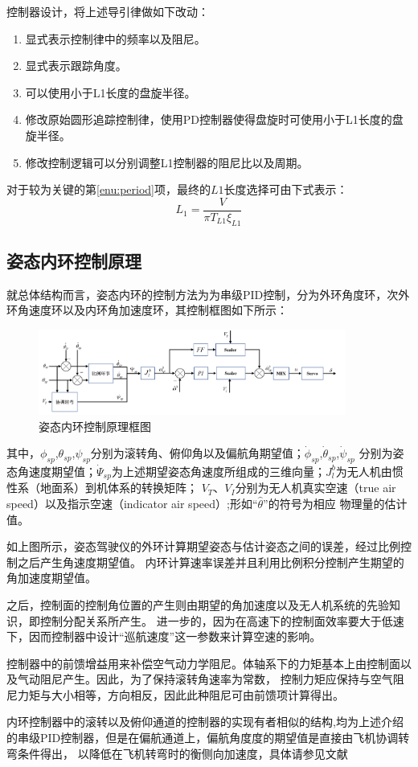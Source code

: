 控制器设计，将上述导引律做如下改动：
\begin{enumerate}
    \item 显式表示控制律中的频率以及阻尼。
    \item 显式表示跟踪角度。
    \item 可以使用小于L1长度的盘旋半径。
    \item 修改原始圆形追踪控制律，使用PD控制器使得盘旋时可使用小于L1长度的盘旋半径。
    \item 修改控制逻辑可以分别调整L1控制器的阻尼比以及周期。\label{enu:period}
\end{enumerate}
对于较为关键的第\ref{enu:period}项，最终的$L1$长度选择可由下式表示：
 \begin{equation}
     L_1 = \frac{V}{\pi T_{L1} \xi_{L1}}
\end{equation}
\subsection{姿态内环控制原理}
就总体结构而言，姿态内环的控制方法为为串级PID控制，分为外环角度环，次外环角速度环以及内环角加速度环，其控制框图如下所示：
\begin{figure}[H]
    \centering
    \includegraphics[width=0.90\textwidth]{figures/c3/attitude_inner_loop}
    \caption{姿态内环控制原理框图}\label{c3-attitude_inner_loop}
\end{figure}
其中，$\phi_{sp}$,$\theta_{sp}$,$\psi_{sp}$分别为滚转角、俯仰角以及偏航角期望值；$\dot{\phi}_{sp}$,$\dot{\theta}_{sp}$,$\dot{\psi}_{sp}$
分别为姿态角速度期望值；$\dot{\Psi}_{sp}$为上述期望姿态角速度所组成的三维向量；$J^{b}_l$为无人机由惯性系（地面系）到机体系的转换矩阵；
$V_T$、$V_I$分别为无人机真实空速（true air speed）以及指示空速（indicator air speed）;形如“$\hat{\theta}$”的符号为相应
物理量的估计值。

如上图所示，姿态驾驶仪的外环计算期望姿态与估计姿态之间的误差，经过比例控制之后产生角速度期望值。
内环计算速率误差并且利用比例积分控制产生期望的角加速度期望值。

之后，控制面的控制角位置的产生则由期望的角加速度以及无人机系统的先验知识，即控制分配关系所产生。
进一步的，因为在高速下的控制面效率要大于低速下，因而控制器中设计“巡航速度”这一参数来计算空速的影响。

控制器中的前馈增益用来补偿空气动力学阻尼。体轴系下的力矩基本上由控制面以及气动阻尼产生。因此，为了保持滚转角速率为常数，
控制力矩应保持与空气阻尼力矩与大小相等，方向相反，因此此种阻尼可由前馈项计算得出。

内环控制器中的滚转以及俯仰通道的控制器的实现有者相似的结构,均为上述介绍的串级PID控制器，但是在偏航通道上，偏航角度度的期望值是直接由飞机协调转弯条件得出，
以降低在飞机转弯时的衡侧向加速度，具体请参见文献\cite{Fangzhenping2005}
